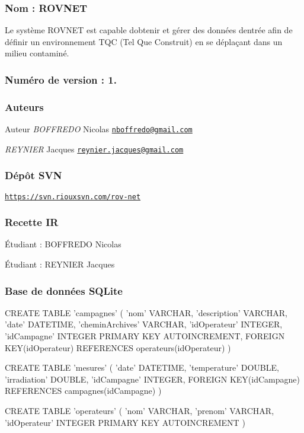 \subsubsection*{Nom \+: R\+OV\textquotesingle{}N\+ET}

Le système R\+OV\textquotesingle{}N\+ET est capable d\textquotesingle{}obtenir et gérer des données d\textquotesingle{}entrée afin de définir un environnement T\+QC (Tel Que Construit) en se déplaçant dans un milieu contaminé.

\subsubsection*{Numéro de version \+: 1.}

\subsubsection*{Auteurs}

\begin{DoxyAuthor}{Auteur}
{\itshape B\+O\+F\+F\+R\+E\+DO} Nicolas \href{mailto:nboffredo@gmail.com}{\tt nboffredo@gmail.\+com}

{\itshape R\+E\+Y\+N\+I\+ER} Jacques \href{mailto:reynier.jacques@gmail.com}{\tt reynier.\+jacques@gmail.\+com}
\end{DoxyAuthor}
\subsubsection*{Dépôt S\+VN}

\href{https://svn.riouxsvn.com/rov-net}{\tt https\+://svn.\+riouxsvn.\+com/rov-\/net}

\subsubsection*{Recette IR}


\begin{DoxyItemize}
\item Étudiant \+: B\+O\+F\+F\+R\+E\+DO Nicolas
\item Étudiant \+: R\+E\+Y\+N\+I\+ER Jacques
\end{DoxyItemize}

\subsubsection*{Base de données S\+Q\+Lite}


\begin{DoxyCode}
CREATE TABLE 'campagnes' ( 'nom' VARCHAR, 'description' VARCHAR, 'date' DATETIME, 'cheminArchives' VARCHAR,
       'idOperateur' INTEGER, 'idCampagne' INTEGER PRIMARY KEY AUTOINCREMENT, FOREIGN KEY(idOperateur) REFERENCES
       operateurs(idOperateur) )

CREATE TABLE 'mesures' ( 'date' DATETIME, 'temperature' DOUBLE, 'irradiation' DOUBLE, 'idCampagne' INTEGER,
       FOREIGN KEY(idCampagne) REFERENCES campagnes(idCampagne) )

CREATE TABLE 'operateurs' ( 'nom' VARCHAR, 'prenom' VARCHAR, 'idOperateur' INTEGER PRIMARY KEY
       AUTOINCREMENT )
\end{DoxyCode}
 